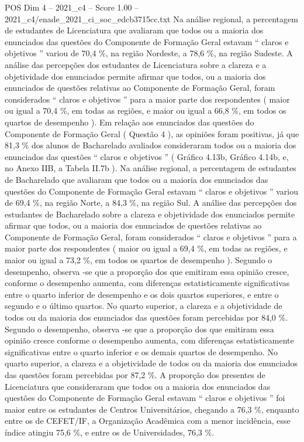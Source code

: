 \begin{textsample}{POS Dim 4 – 2021\_c4 – Score 1.00 – 2021\_c4/enade\_2021\_ci\_soc\_edcb3715cc.txt}
Na análise regional, a percentagem de estudantes de Licenciatura que avaliaram que todos ou a maioria dos enunciados das questões do Componente de Formação Geral estavam “ claros e objetivos ” variou de 70,4 \%, na região Nordeste, a 78,6 \%, na região Sudeste.
A análise das percepções dos estudantes de Licenciatura sobre a clareza e a objetividade dos enunciados permite afirmar que todos, ou a maioria dos enunciados de questões relativas ao Componente de Formação Geral, foram considerados “ claros e objetivos ” para a maior parte dos respondentes ( maior ou igual a 70,4 \%, em todas as regiões, e maior ou igual a 66,8 \%, em todos os quartos de desempenho ).
Em relação aos enunciados das questões do Componente de Formação Geral ( Questão 4 ), as opiniões foram positivas, já que 81,3 \% dos alunos de Bacharelado avaliados consideraram todos ou a maioria dos enunciados das questões “ claros e objetivos ” ( Gráfico 4.13b, Gráfico 4.14b, e, no Anexo IIB, a Tabela II.7b ).
Na análise regional, a percentagem de estudantes de Bacharelado que avaliaram que todos ou a maioria dos enunciados das questões do Componente de Formação Geral estavam “ claros e objetivos ” variou de 69,4 \%, na região Norte, a 84,3 \%, na região Sul.
A análise das percepções dos estudantes de Bacharelado sobre a clareza e objetividade dos enunciados permite afirmar que todos, ou a maioria dos enunciados de questões relativas ao Componente de Formação Geral, foram considerados “ claros e objetivos ” para a maior parte dos respondentes ( maior ou igual a 69,4 \%, em todas as regiões, e maior ou igual a 73,2 \%, em todos os quartos de desempenho ).
Segundo o desempenho, observa -se que a proporção dos que emitiram essa opinião cresce, conforme o desempenho aumenta, com diferenças estatisticamente significativas entre o quarto inferior de desempenho e os dois quartos superiores, e entre o segundo e o último quartos.
No quarto superior, a clareza e a objetividade de todos ou da maioria dos enunciados das questões foram percebidas por 84,0 \%.
Segundo o desempenho, observa -se que a proporção dos que emitiram essa opinião cresce conforme o desempenho aumenta, com diferenças estatisticamente significativas entre o quarto inferior e os demais quartos de desempenho.
No quarto superior, a clareza e a objetividade de todos ou da maioria dos enunciados das questões foram percebidas por 87,2 \%.
A proporção dos presentes de Licenciatura que consideraram que todos ou a maioria dos enunciados das questões do Componente de Formação Geral estavam “ claros e objetivos ” foi maior entre os estudantes de Centros Universitários, chegando a 76,3 \%, enquanto entre os de CEFET/IF, a Organização Acadêmica com a menor incidência, esse índice atingiu 75,6 \%, e entre os de Universidades, 76,3 \%.

\end{textsample}
